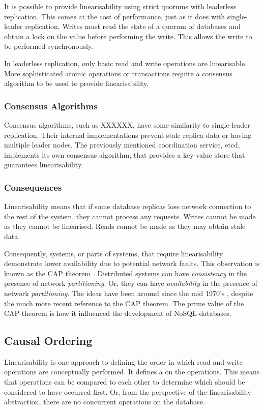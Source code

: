 It is possible to provide linearisability using strict quorums with leaderless replication.
This comes at the cost of performance, just as it does with single-leader replication.
Writes must read the state of a quorum of databases and obtain a lock on the value before performing the write.
This allows the write to be performed synchronously.

In leaderless replication, only basic read and write operations are linearisable.
More sophisticated atomic operations or transactions require a consensus algorithm to be used to provide linearisability.

\subsubsection{Consensus Algorithms}
Consensus algorithms, such as XXXXXX, have some similarity to single-leader replication.
Their internal implementations prevent stale replica data or having multiple leader nodes.
The previously mentioned coordination service, etcd, implements its own consensus algorithm,
that provides a key-value store that guarantees linearisability.

\subsubsection{Consequences}
Linearisability means that if some database replicas lose network connection to the rest of the system,
they cannot process any requests.
Writes cannot be made as they cannot be linearised.
Reads connot be made as they may obtain stale data.

Consequently, systems, or parts of systems, that require linearisability demonstrate lower availability due to potential network faults.
This observation is known as the CAP theorem \cite{BrewerE2012Ctyl}.
Distributed systems can have \emph{consistency} in the presence of network \emph{partitioning}.
Or, they can have \emph{availability} in the presence of network \emph{partitioning}.
The ideas have been around since the mid 1970's \cite{rfc677}, despite the much more recent reference to the CAP theorem.
The prime value of the CAP theorem is how it influenced the development of NoSQL databases.

\subsection{Causal Ordering}

Linearisability is one approach to defining the order in which read and write operations are conceptually performed.
It defines a  on the operations.
This means that operations can be compared to each other to determine which should be considered to have occurred first.
Or, from the perspective of the linearisability abstraction, there are no concurrent operations on the database.

